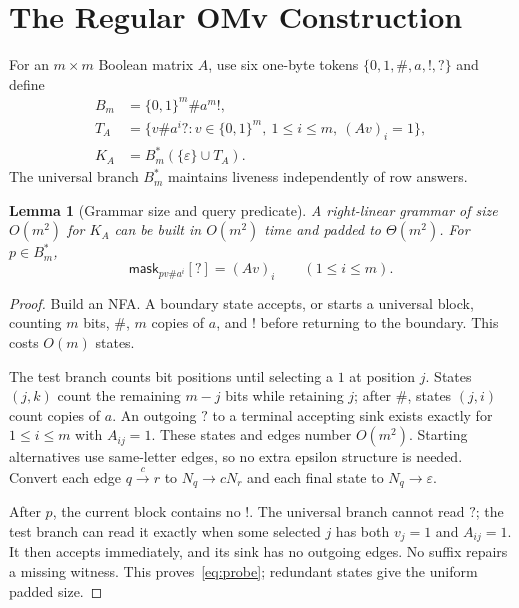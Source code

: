 \documentclass[manuscript,screen,11pt,nonacm]{acmart}
\newtheorem{lemma}[theorem]{Lemma}
\theoremstyle{definition}\newtheorem{definition}{Definition}
\newcommand{\eps}{\varepsilon}
\newcommand{\bits}{\{0,1\}}
\newcommand{\mask}{\mathsf{mask}}
\begin{document}
\section{The Regular OMv Construction}\label{sec:lower}
For an $m\times m$ Boolean matrix $A$, use six one-byte tokens $\{0,1,\#,a,!,?\}$ and define
\begin{align}
 B_m&=\bits^m\#a^m!,\label{eq:block}\\
 T_A&=\{v\#a^i?:v\in\bits^m,\ 1\le i\le m,\ (Av)_i=1\},\\
 K_A&=B_m^*(\{\eps\}\cup T_A).\label{eq:lang}
\end{align}
The universal branch $B_m^*$ maintains liveness independently of row answers.

\begin{lemma}[Grammar size and query predicate]\label{lem:gadget}
A right-linear grammar of size $O(m^2)$ for $K_A$ can be built in $O(m^2)$ time and padded to $\Theta(m^2)$. For $p\in B_m^*$,
\begin{equation}\label{eq:probe}
 \mask_{pv\#a^i}[?]=(Av)_i\qquad(1\le i\le m).
\end{equation}
\end{lemma}
\begin{proof}
Build an NFA. A boundary state accepts, or starts a universal block, counting $m$ bits, $\#$, $m$ copies of $a$, and $!$ before returning to the boundary. This costs $O(m)$ states.

The test branch counts bit positions until selecting a $1$ at position $j$. States $(j,k)$ count the remaining $m-j$ bits while retaining $j$; after $\#$, states $(j,i)$ count copies of $a$. An outgoing $?$ to a terminal accepting sink exists exactly for $1\le i\le m$ with $A_{ij}=1$. These states and edges number $O(m^2)$. Starting alternatives use same-letter edges, so no extra epsilon structure is needed. Convert each edge $q\xrightarrow c r$ to $N_q\to cN_r$ and each final state to $N_q\to\eps$.

After $p$, the current block contains no $!$. The universal branch cannot read $?$; the test branch can read it exactly when some selected $j$ has both $v_j=1$ and $A_{ij}=1$. It then accepts immediately, and its sink has no outgoing edges. No suffix repairs a missing witness. This proves~\eqref{eq:probe}; redundant states give the uniform padded size.
\end{proof}
\end{document}
